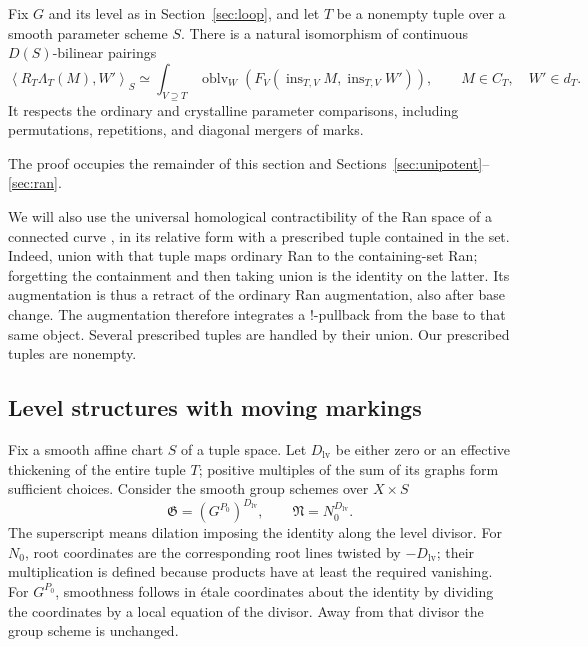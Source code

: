 \begin{theorem}\label{loc:period-comparison}
Fix $G$ and its level as in Section~\ref{sec:loop}, and let $T$ be a
nonempty tuple over a smooth parameter scheme $S$.  There is a natural
isomorphism of continuous $D(S)$-bilinear pairings
\begin{equation}\label{eq:T1}
 \left\langle R_T\Lambda_T(M),W'\right\rangle_S
 \simeq
 \int_{V\supseteq T}
 \operatorname{oblv}_W\!\left(
 F_V(\operatorname{ins}_{T,V}M,
             \operatorname{ins}_{T,V}W')\right),
 \qquad M\in C_T,\quad W'\in d_T.
\end{equation}
It respects the ordinary and crystalline parameter comparisons,
including permutations, repetitions, and diagonal mergers of marks.
\end{theorem}

The proof occupies the remainder of this section and
Sections~\ref{sec:unipotent}--\ref{sec:ran}.

We will also use the universal homological contractibility of the Ran
space of a connected curve \cite{GaitsgoryContractibility}, in its
relative form with a prescribed tuple contained in the set.  Indeed,
union with that tuple maps ordinary Ran to the containing-set Ran;
forgetting the containment and then taking union is the identity on the
latter.  Its augmentation is thus a retract of the ordinary Ran
augmentation, also after base change.  The augmentation therefore
integrates a $!$-pullback from the base to that same object.  Several
prescribed tuples are handled by their union.  Our prescribed tuples
are nonempty.

\subsection{Level structures with moving markings}

Fix a smooth affine chart $S$ of a tuple space.  Let $D_{\mathrm{lv}}$
be either zero or an effective thickening of the entire tuple $T$;
positive multiples of the sum of its graphs form sufficient choices.
Consider the smooth group schemes over $X\times S$
\[
 \mathfrak G=(G^{P_0})^{D_{\mathrm{lv}}},\qquad
 \mathfrak N=N_0^{D_{\mathrm{lv}}}.
\]
The superscript means dilation imposing the identity along the level
divisor.  For $N_0$, root coordinates are the corresponding root lines
twisted by $-D_{\mathrm{lv}}$; their multiplication is defined because
products have at least the required vanishing.  For $G^{P_0}$,
smoothness follows in \'etale coordinates about the identity by
dividing the coordinates by a local equation of the divisor.  Away from
that divisor the group scheme is unchanged.

